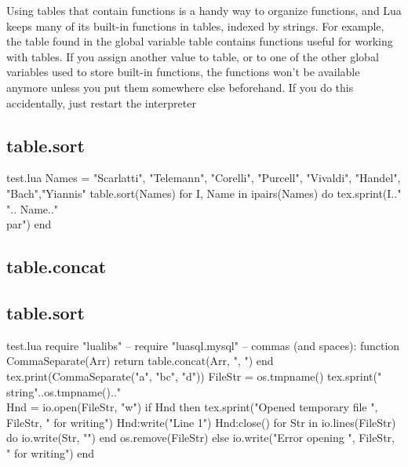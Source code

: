 \clearpage
Using tables that contain functions is a handy way to organize functions, and Lua keeps many of its
built-in functions in tables, indexed by strings. For example, the table found in the global variable table
contains functions useful for working with tables. If you assign another value to table, or to one of the
other global variables used to store built-in functions, the functions won’t be available anymore unless
you put them somewhere else beforehand. If you do this accidentally, just restart the interpreter

\subsection{table.sort}
\begin{tcblisting}{}
\begin{filecontents*}{test.lua}
Names = {"Scarlatti", "Telemann", "Corelli", "Purcell",
   "Vivaldi", "Handel", "Bach","Yiannis"}
table.sort(Names)
 for I, Name in ipairs(Names) do
   tex.sprint(I.." ".. Name.."\\par")
 end
\end{filecontents*}
\end{tcblisting}

\subsection{table.concat}
\subsection{table.sort}
\begin{tcblisting}{}
\begin{filecontents*}{test.lua}
require "lualibs"
-- require "luasql.mysql"
-- commas (and spaces):
 function CommaSeparate(Arr)
   return table.concat(Arr, ", ")
 end
 tex.print(CommaSeparate({"a", "bc", "d"}))
 FileStr = os.tmpname()
    tex.sprint("\\string"..os.tmpname().." \\%
 Hnd = io.open(FileStr, "w")
 if Hnd then
   tex.sprint("Opened temporary file ", FileStr, " for writing\n")
   Hnd:write("Line 1\n")
Hnd:close()
for Str in io.lines(FileStr) do
  io.write(Str, "\n")
end
  os.remove(FileStr)
else
   io.write("Error opening ", FileStr, " for writing\n")
end
\end{filecontents*}

\end{tcblisting}

